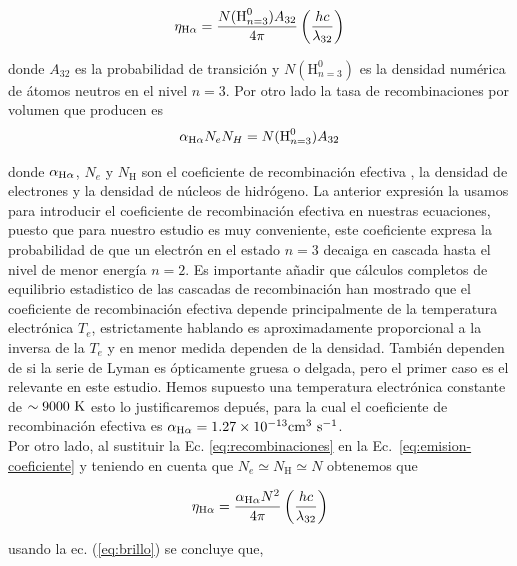   \begin{equation}
    \label{eq:emision-coeficiente}
    \eta_{\mathrm{H}\alpha} = \frac{N(\text{H}^0_{n=3})A_{32}}{4 \pi} \left(\frac{hc}{\lambda_{32}}\right) 
  \end{equation}

donde \(A_{32}\) es la probabilidad de transición y \(N(\text{H}^0_{n=3})\) es la densidad numérica de átomos neutros en el nivel \(n=3\). Por otro lado la tasa de recombinaciones por volumen que producen \ha{} es 
\begin{equation}
  \label{eq:recombinaciones}
  \alpha_{\mathrm{H}\alpha} N_{e}N_{H}=N(\text{H}^0_{n=3})A_{32}
\end{equation}

donde  \(\alpha_{\mathrm{H}\alpha}\), \(N_{e}\) y \(N_{\text{H}}\)  son el coeficiente de recombinación efectiva \citep{Osterbrock:2006}, la densidad de electrones y la densidad de núcleos de hidrógeno. La anterior expresión la usamos para introducir el coeficiente de recombinación efectiva en nuestras ecuaciones, puesto que para nuestro estudio es muy conveniente, este coeficiente expresa la probabilidad de que un electrón en el estado \(n=3\) decaiga en cascada hasta el nivel de menor energía \(n=2\). Es importante añadir que cálculos completos de equilibrio estadistico de las cascadas de recombinación han mostrado que el coeficiente de recombinación efectiva depende principalmente de la temperatura electrónica \(T_{e}\), estrictamente hablando es aproximadamente proporcional a la inversa de la  \(T_{e}\) \citep{Pequignot:1991, Nussbaumer:1984} y en menor medida dependen de la densidad. También dependen de si la serie de Lyman es ópticamente gruesa o delgada, pero el primer caso es el relevante en este estudio. Hemos supuesto una temperatura electrónica constante de \(\sim 9000~\mathrm{K} \) esto lo justificaremos depués, para la cual el coeficiente de recombinación efectiva es \(\alpha_{\mathrm{H}\alpha}=1.27\times 10^{-13}\mathrm{cm}^{3}~\text{s}^{-1} \).\\

Por otro lado, al sustituir la Ec. \ref{eq:recombinaciones} en la Ec.~\ref{eq:emision-coeficiente} y teniendo en cuenta que \(N_{e}\simeq N_{\text{H}} \simeq N\) obtenemos que

\begin{equation}
 \eta_{\mathrm{H}\alpha} =  \frac{\alpha_{\mathrm{H}\alpha}N^{2}}{4\pi} \left(\frac{hc}{\lambda_{32}}\right)  
\end{equation}

 usando la ec. (\ref{eq:brillo}) se concluye que,

